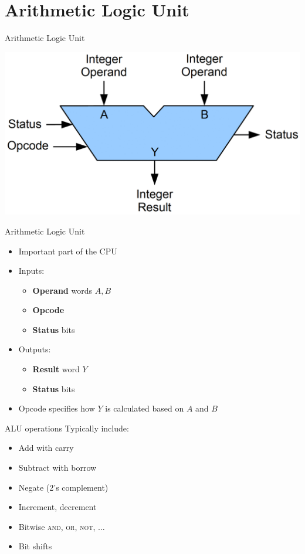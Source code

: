 \part{Arithmetic Logic Unit}
\frame{\partpage}

\begin{frame}{Arithmetic Logic Unit}
	\begin{center}
		\includegraphics[width=\textwidth]{alu}
	\end{center}
\end{frame}

\begin{frame}{Arithmetic Logic Unit}
	\begin{itemize}
		\pause\item Important part of the CPU
		\pause\item Inputs:
			\begin{itemize}
				\item \textbf{Operand} words $A, B$
				\item \textbf{Opcode}
				\item \textbf{Status} bits
			\end{itemize}
		\pause\item Outputs:
			\begin{itemize}
				\item \textbf{Result} word $Y$
				\item \textbf{Status} bits
			\end{itemize}
		\pause\item Opcode specifies how $Y$ is calculated based on $A$ and $B$
	\end{itemize}
\end{frame}

\begin{frame}{ALU operations}
	Typically include:
	\begin{itemize}
		\pause\item Add with carry
		\pause\item Subtract with borrow
		\pause\item Negate (2's complement)
		\pause\item Increment, decrement
		\pause\item Bitwise \textsc{and}, \textsc{or}, \textsc{not}, $\dots$
		\pause\item Bit shifts
	\end{itemize}
\end{frame}


